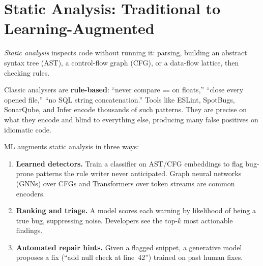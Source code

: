 \section{Static Analysis: Traditional to Learning-Augmented}\label{sec:static}
\emph{Static analysis} inspects code without running it: parsing, building an abstract syntax tree (AST), a control-flow graph (CFG), or a data-flow lattice, then checking rules.

Classic analysers are \textbf{rule-based}: ``never compare \texttt{==} on floats,'' ``close every opened file,'' ``no SQL string concatenation.'' Tools like ESLint, SpotBugs, SonarQube, and Infer encode thousands of such patterns. They are precise on what they encode and blind to everything else, producing many false positives on idiomatic code.

ML augments static analysis in three ways:

\begin{enumerate}[leftmargin=1.2em, itemsep=0.35em]
  \item \textbf{Learned detectors.} Train a classifier on AST/CFG embeddings to flag bug-prone patterns the rule writer never anticipated. Graph neural networks (GNNs) over CFGs and Transformers over token streams are common encoders.
  \item \textbf{Ranking and triage.} A model scores each warning by likelihood of being a true bug, suppressing noise. Developers see the top-$k$ most actionable findings.
  \item \textbf{Automated repair hints.} Given a flagged snippet, a generative model proposes a fix (``add null check at line~42'') trained on past human fixes.
\end{enumerate}


